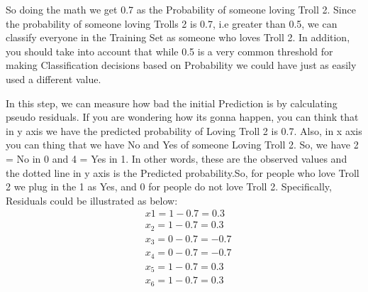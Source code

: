 \documentclass[12pt, a4paper]{article} %
\begin{document}
So doing the math we get 0.7 as the Probability of someone loving Troll 2. Since the probability of someone loving Trolls 2 is 0.7, i.e greater than 0.5, we can classify everyone in the Training Set as someone who loves Troll 2. In addition, you should take into account that while 0.5 is a very common threshold for making Classification decisions based on Probability we could have just as easily used a different value.

In this step, we can measure how bad the initial Prediction is by calculating pseudo residuals. If you are wondering how its gonna happen, you can think that in y axis we have the predicted probability of Loving Troll 2 is 0.7. Also, in x axis you can thing that we have No and Yes of someone Loving Troll 2. So, we have 2 = No in 0 and 4 = Yes in 1. In other words, these are the observed values and the dotted line in y axis is the Predicted probability.So, for people who love Troll 2 we plug in the 1 as Yes, and 0 for people do not love Troll 2. Specifically, Residuals could be illustrated as below:
\begin{align*}
    & x{1}  = 1 - 0.7 = 0.3\\
    & x_{2} = 1 - 0.7 = 0.3\\
    & x_{3} = 0 - 0.7 = -0.7\\
    & x_{4} = 0 - 0.7 = -0.7\\
    & x_{5} = 1 - 0.7 = 0.3\\
    & x_{6} = 1 - 0.7 = 0.3\\
\end{align*}
\end{document}
